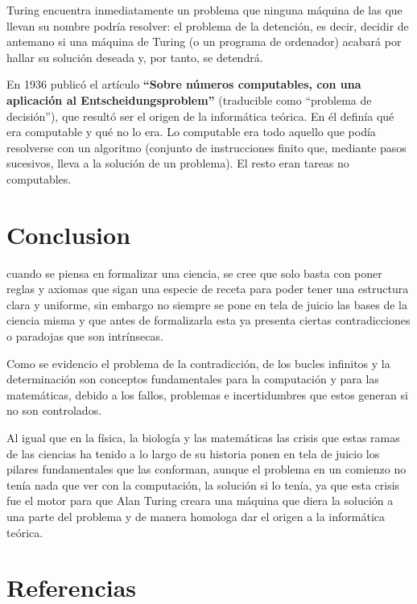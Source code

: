 \documentclass{article}
\begin{document}
Turing encuentra inmediatamente un problema que ninguna máquina de las que llevan su nombre podría resolver: el problema de la detención, es decir, decidir de antemano si una máquina de Turing (o un programa de ordenador) acabará por hallar su solución deseada y, por tanto, se detendrá.

En 1936 publicó el artículo \textbf{“Sobre números computables, con una aplicación al Entscheidungsproblem”} (traducible como “problema de decisión”), que resultó ser el origen de la informática teórica. En él definía qué era computable y qué no lo era. Lo computable era todo aquello que podía resolverse con un algoritmo (conjunto de instrucciones finito que, mediante pasos sucesivos, lleva a la solución de un problema). El resto eran tareas no computables.

\section*{Conclusion}
cuando se piensa en formalizar una ciencia, se cree que solo basta con poner reglas y axiomas que sigan una especie de receta para poder tener una estructura clara y uniforme, sin embargo no siempre se pone en tela de juicio las bases de la ciencia misma y que antes de formalizarla esta ya presenta ciertas contradicciones o paradojas que son intrínsecas.

\hspace{2ex}

Como se evidencio el problema de la contradicción, de los bucles infinitos y la determinación son conceptos fundamentales para la computación y para las matemáticas, debido a los fallos, problemas e incertidumbres que estos generan si no son controlados.

\hspace{2ex}

Al igual que en la física, la biología y las matemáticas las crisis que estas ramas de las ciencias ha  tenido a lo largo de su historia ponen en tela de juicio los pilares fundamentales que las conforman, aunque el problema en un comienzo no tenía nada que ver con la computación, la solución si lo tenía, ya que esta crisis fue el motor para que Alan Turing creara una máquina que diera la solución a una parte del problema y de manera homologa dar el origen a la informática teórica.

\section*{Referencias}
\end{document}
